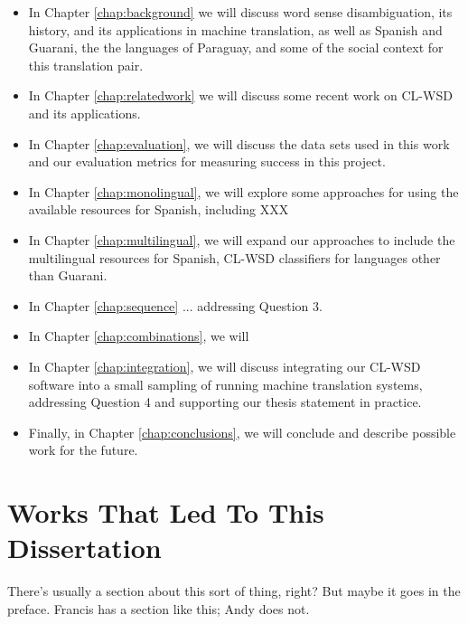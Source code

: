 \begin{itemize}
\item In Chapter \ref{chap:background} we will discuss word sense
disambiguation, its history, and its applications in machine translation, as
well as Spanish and Guarani, the the languages of Paraguay, and some of the
social context for this translation pair.
\item In Chapter \ref{chap:relatedwork} we will discuss some recent work on
CL-WSD and its applications.
\item In Chapter \ref{chap:evaluation}, we will discuss the data sets used in
this work and our evaluation metrics for measuring success in this project.
\item In Chapter \ref{chap:monolingual}, we will explore some approaches for
using the available resources for Spanish, including XXX
\item In Chapter \ref{chap:multilingual}, we will expand our approaches to
include the multilingual resources for Spanish, CL-WSD classifiers for
languages other than Guarani.
\item In Chapter \ref{chap:sequence} ... addressing Question 3.
\item In Chapter \ref{chap:combinations}, we will 
\item In Chapter \ref{chap:integration}, we will discuss integrating our CL-WSD
software into a small sampling of running machine translation systems,
addressing Question 4 and supporting our thesis statement in practice.
\item Finally, in Chapter \ref{chap:conclusions}, we will conclude and describe
possible work for the future.
\end{itemize}

\section{Works That Led To This Dissertation}
There's usually a section about this sort of thing, right?
But maybe it goes in the preface.
Francis has a section like this; Andy does not.
